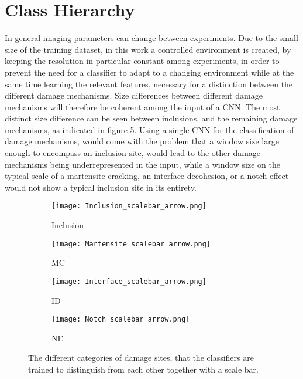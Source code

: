 \section{Class Hierarchy}
\label{sec:Architecture}

In general imaging parameters can change between experiments. Due to the small size of the training dataset, in this work a controlled environment is created, by keeping the resolution in particular constant among experiments, in order to prevent the need for a classifier to adapt to a changing environment while at the same time learning the relevant features, necessary for a distinction between the different damage mechanisms. Size differences between different damage mechanisms will therefore be coherent among the input of a CNN. The most distinct size difference can be seen between inclusions, and the remaining damage mechanisms, as indicated in figure \ref{fig:SizeDifference}. Using a single CNN for the classification of damage mechanisms, would come with the problem that a window size large enough to encompass an inclusion site, would lead to the other damage mechanisms being underrepresented in the input, while a window size on the typical scale of a martensite cracking, an interface decohesion, or a notch effect would not show a typical inclusion site in its entirety. \\

\begin{figure}[H]
\centering
\begin{subfigure}{.25\textwidth}
\centering
  \texttt{[image: Inclusion\_scalebar\_arrow.png]}
  \caption{Inclusion}
  \label{fig:Inclusion_scalebar}
\end{subfigure}%
\begin{subfigure}{.25\textwidth}
\centering
  \texttt{[image: Martensite\_scalebar\_arrow.png]}
  \caption{MC}
  \label{fig:Martensite_scalebar}
\end{subfigure}%
\begin{subfigure}{.25\textwidth}
\centering
  \texttt{[image: Interface\_scalebar\_arrow.png]}
  \caption{ID}
  \label{fig:Interface_scalebar}
\end{subfigure}%
\begin{subfigure}{.25\textwidth}
\centering
  \texttt{[image: Notch\_scalebar\_arrow.png]}
  \caption{NE}
  \label{fig:Notch_scalebar}
\end{subfigure}%
\caption{The different categories of damage sites, that the classifiers are trained to distinguish from each other together with a scale bar.}
\label{fig:SizeDifference}
\end{figure}

